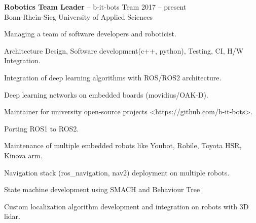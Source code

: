 \documentclass{article}
\newcommand{\employer}[4]{{
\vspace*{2pt}%
\textbf{#1} #2 \hfill #3\\ #4 \vspace*{2pt}}
}
\renewcommand{\labelitemii}{
	\raisebox{0.3ex}{\tiny\textbullet}
}
\newenvironment{bullet-list-minor}{
\begin{list}{\labelitemii}{\setlength\leftmargin{15pt} 
\topsep 0pt \itemsep -2pt}}{\vspace*{4pt}\end{list}
}
\begin{document}
    \employer{Robotics Team Leader}{-- b-it-bots Team}{2017 -- present}
    {Bonn-Rhein-Sieg University of Applied Sciences}
	\begin{bullet-list-minor}
		\item Managing a team of software developers and roboticist.
		\item Architecture Design, Software development(c++, python), Testing, CI, H/W Integration.
		\item Integration of deep learning algorithms with ROS/ROS2 architecture.
		\item Deep learning networks on embedded boards (movidius/OAK-D).
		\item Maintainer for university open-source projects <https://github.com/b-it-bots>.
		\item Porting ROS1 to ROS2.
		\item Maintenance of multiple embedded robots like Youbot, Robile, Toyota HSR, Kinova arm.
		\item Navigation stack (ros\_navigation, nav2) deployment on multiple robots.
		\item State machine development using SMACH and Behaviour Tree
		\item Custom localization algorithm development and integration on robots with 3D lidar.
    \end{bullet-list-minor}
    
    
\end{document}
